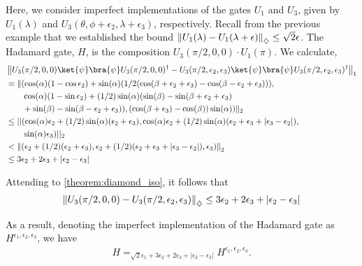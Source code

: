 \begin{example}
    Here, we consider imperfect implementations of the gates $U_1$ and $U_3$, given by $ U_1(\lambda) $ and $ U_3(\theta, \phi + \epsilon_2, \lambda + \epsilon_3)$, respectively. 
    Recall from the previous example that we established the bound $\left\lVert U_1(\lambda)- U_1(\lambda + \epsilon)  \right\rVert_{\diamondsuit} \leq \sqrt{2} \epsilon$.
     The Hadamard gate, $H$, is the composition $U_3(\pi/2, 0, 0)\cdot U_1(\pi)$. We calculate,
    \begin{align*}
      &\tracenorm{U_3(\pi/2, 0, 0) \ket{\psi}\bra{\psi}U_3(\pi/2, 0, 0)^\dag - U_3(\pi/2, \epsilon_2, \epsilon_3)  \ket{\psi}\bra{\psi}U_3(\pi/2, \epsilon_2, \epsilon_3)^\dag} \\
      & = \lVert (\cos(\alpha)( 1-\cos{\epsilon_2}) + \sin(\alpha)( 1/2(\cos(\beta + \epsilon_2 + \epsilon_3)-\cos(\beta - \epsilon_2 + \epsilon_3))), \\
      & \hspace{20pt} \cos(\alpha)( 1-\sin{\epsilon_2}) + (1/2)\sin(\alpha) (\sin(\beta)-\sin(\beta+\epsilon_2 + \epsilon_3)   \\
      & \hspace{20pt} + \sin(\beta)-\sin(\beta-\epsilon_2 + \epsilon_3)),  (\cos(\beta + \epsilon_3)-\cos(\beta))\sin(\alpha) ) \lVert_2 \\
      & \leq ||(\cos(\alpha) \epsilon_2 + (1/2)\sin(\alpha) (\epsilon_2 + \epsilon_3) ,\cos(\alpha) \epsilon_2 + (1/2)  \sin(\alpha) (\epsilon_2 + \epsilon_3 + |\epsilon_3-\epsilon_2|), \\
      & \hspace{20pt} \sin(\alpha) \epsilon_3)||_2 \\
      &  < \euclideannorm{(\epsilon_2 + (1/2)(\epsilon_2 + \epsilon_3), \epsilon_2 + (1/2)   (\epsilon_2 + \epsilon_3 + |\epsilon_3-\epsilon_2|), \epsilon_3)}  \\
      & \leq 3 \epsilon_2 +  2\epsilon_3 + |\epsilon_2-\epsilon_3| \\
    \end{align*}

    Attending to \autoref{theorem:diamond_iso}, it follows that
    \begin{align*}
      \left\lVert U_3(\pi/2, 0, 0)- U_3(\pi/2, \epsilon_2, \epsilon_3)  \right\rVert_{\diamondsuit} \leq 3 \epsilon_2 +  2\epsilon_3 + |\epsilon_2-\epsilon_3|
    \end{align*}
    
    As a result, denoting the imperfect implementation of the Hadamard gate as $H^{\epsilon_1 ,\epsilon_2, \epsilon_3}$, we have 
    \begin{align} \label{eq:h_error_telepor}
      H =_{ \sqrt{2}\epsilon_1 + 3 \epsilon_2 + 2\epsilon_3 + |\epsilon_2-\epsilon_3|} H^{\epsilon_1 ,\epsilon_2, \epsilon_3}.
    \end{align}
 


\end{example}
